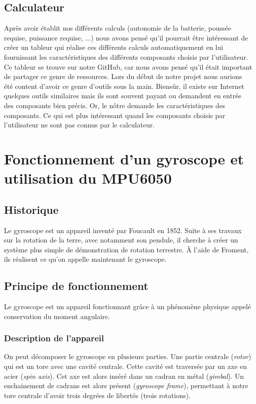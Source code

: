 \documentclass[a4paper,10pt]{report}
\begin{document}
      \section{Calculateur}
	Après avoir établit nos différents calculs (autonomie de la batterie, 
poussée requise, puissance requise, ...) nous avons pensé qu'il pourrait être 
intéressant de créer un tableur qui réalise ces différents calculs 
automatiquement en lui fournissant les caractéristiques des différents 
composants choisis par l'utilisateur. Ce tableur se trouve sur notre GitHub, 
car nous avons pensé qu'il était important de partager ce genre de ressources. 
Lors du début de notre projet nous aurions été content d'avoir ce genre 
d'outils sous la main. Biensûr, il existe sur Internet quelques outils 
similaires\cite{dronecalc} mais ils sont souvent payant ou demandent en entrée 
des composants bien précis. Or, le nôtre demande les caractéristiques des 
composants. Ce qui est plus intéressant quand les composants choisis par 
l'utilisateur ne sont pas connus par le calculateur.
	
    \chapter{Fonctionnement d'un gyroscope et utilisation du MPU6050}
      \section{Historique}
	Le gyroscope est un appareil inventé par Foucault en 1852. Suite à ses 
travaux sur la rotation de la terre, avec notamment son pendule, il cherche à 
créer un système plus simple de démonstration de rotation terrestre. À l'aide 
de Froment, ils réalisent ce qu'on appelle maintenant le gyroscope.

      \section{Principe de fonctionnement}
	Le gyroscope est un appareil fonctionnant grâce à un phénomène physique 
appelé conservation du moment angulaire.
      
	\subsection{Description de l'appareil}
	  On peut décomposer le gyroscope en plusieurs parties. Une partie 
centrale (\textit{rotor}) qui est un tore avec une cavité centrale. Cette 
cavité est traversée par un axe en acier (\textit{spin axis}). Cet axe est 
alors inséré dans un cadran en métal (\textit{gimbal}). Un enchainement de 
cadrans est alors présent (\textit{gyroscope frame}), permettant à notre tore 
centrale d'avoir trois degrées de libertés (trois rotations).
\end{document}
